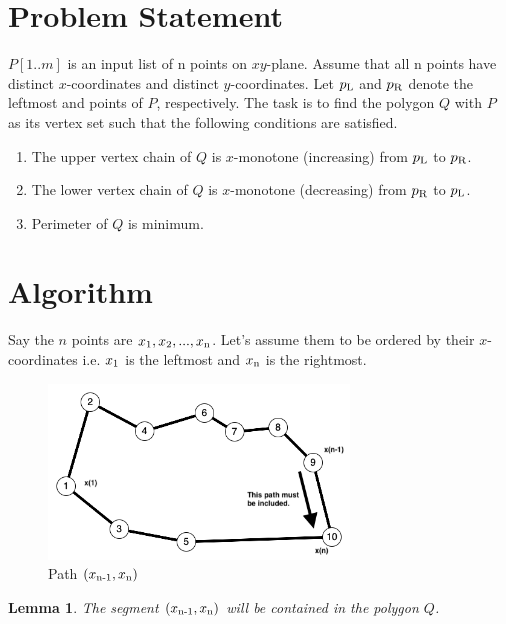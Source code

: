 \documentclass[12pt,letterpaper]{article}
\begin{document}
\section*{Problem Statement}
    $P[1..m]$ is an input list of n points on $xy$-plane. Assume that all n points have distinct $x$-coordinates and distinct $y$-coordinates. Let $p\textsubscript{L}$ and $p\textsubscript{R}$ denote the leftmost and points of $P$, respectively. The task is to find the polygon $Q$ with $P$ as its vertex set such that the following conditions are satisfied.

    \begin{enumerate}
        \item The upper vertex chain of $Q$ is $x$-monotone (increasing) from $p\textsubscript{L}$ to $p\textsubscript{R}$.
        \item The lower vertex chain of $Q$ is $x$-monotone (decreasing) from $p\textsubscript{R}$ to $p\textsubscript{L}$.
        \item Perimeter of $Q$ is minimum.
    \end{enumerate}

\section*{Algorithm}

    Say the $n$ points are $x\textsubscript{1}, x\textsubscript{2},..., x\textsubscript{n}$. Let's assume them to be ordered by their $x$-coordinates i.e. $x\textsubscript{1}$ is the leftmost and $x\textsubscript{n}$ is the rightmost.

    \begin{figure}[htp]
    \centering
        \includegraphics[width=8cm]{TOCFctRDSbmtFSit5.png}
            \caption{Path $(x\textsubscript{n-1}, x\textsubscript{n})$}
        \label{fig:galaxy}
    \end{figure}

    \newtheorem{lemma}{Lemma}
    \begin{lemma}
        The segment $(x\textsubscript{n-1}, x\textsubscript{n})$ will be contained in the polygon $Q$.
    \end{lemma}
\end{document}
